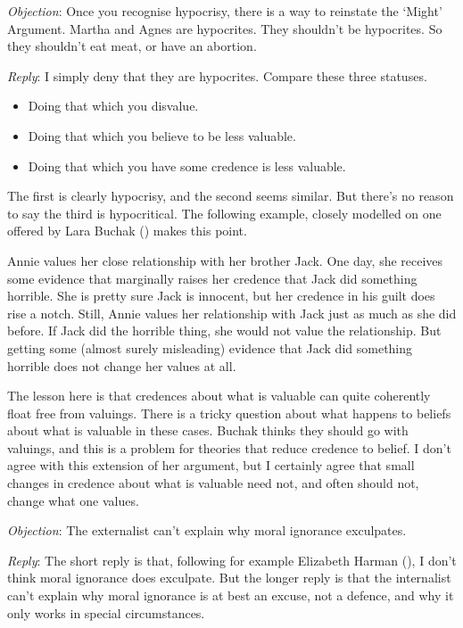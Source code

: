 \documentclass[
  10pt,
  letterpaper,
  DIV=11,
  numbers=noendperiod,
  twoside]{scrartcl}
\providecommand{\tightlist}{%
  \setlength{\itemsep}{0pt}\setlength{\parskip}{0pt}}\usepackage{longtable,booktabs,array}
\begin{document}
\emph{Objection}: Once you recognise hypocrisy, there is a way to
reinstate the `Might' Argument. Martha and Agnes are hypocrites. They
shouldn't be hypocrites. So they shouldn't eat meat, or have an
abortion.

\emph{Reply}: I simply deny that they are hypocrites. Compare these
three statuses.

\begin{itemize}
\tightlist
\item
  Doing that which you disvalue.
\item
  Doing that which you believe to be less valuable.
\item
  Doing that which you have some credence is less valuable.
\end{itemize}

The first is clearly hypocrisy, and the second seems similar. But
there's no reason to say the third is hypocritical. The following
example, closely modelled on one offered by Lara Buchak
() makes this point.

Annie values her close relationship with her brother Jack. One day, she
receives some evidence that marginally raises her credence that Jack did
something horrible. She is pretty sure Jack is innocent, but her
credence in his guilt does rise a notch. Still, Annie values her
relationship with Jack just as much as she did before. If Jack did the
horrible thing, she would not value the relationship. But getting some
(almost surely misleading) evidence that Jack did something horrible
does not change her values at all.

The lesson here is that credences about what is valuable can quite
coherently float free from valuings. There is a tricky question about
what happens to beliefs about what is valuable in these cases. Buchak
thinks they should go with valuings, and this is a problem for theories
that reduce credence to belief. I don't agree with this extension of her
argument, but I certainly agree that small changes in credence about
what is valuable need not, and often should not, change what one values.

\emph{Objection}: The externalist can't explain why moral ignorance
exculpates.

\emph{Reply}: The short reply is that, following for example Elizabeth
Harman (), I don't think moral ignorance
does exculpate. But the longer reply is that the internalist can't
explain why moral ignorance is at best an excuse, not a defence, and why
it only works in special circumstances.
\end{document}

